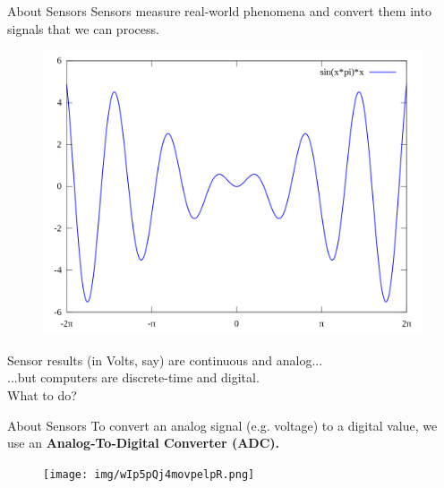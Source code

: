 \documentclass{beamer}
\begin{document}
	\begin{frame}[t]{About Sensors}
		\small Sensors measure real-world phenomena and convert them into signals that we can process.	\\
		\vspace{0.5em}
		\begin{figure}
			\centering
			\includegraphics[width=\textwidth,height=0.6\textheight,keepaspectratio]{img/sine.png}
		\end{figure}
		Sensor results (in Volts, say) are continuous and analog...	\\	
		\hspace{2em}...but computers are discrete-time and digital. \\	
		\vspace{2em}		
		What to do? \\
	\end{frame}
	
\begin{frame}[fragile]{About Sensors}
\small{To convert an analog signal (e.g. voltage) to a digital value, we use an {\bf Analog-To-Digital Converter (ADC).}}	\\
\vspace{0.5em}
\begin{figure}[b]
\centering
\texttt{[image: img/wIp5pQj4movpelpR.png]}
\end{figure}
\end{frame}	
	
\end{document}
